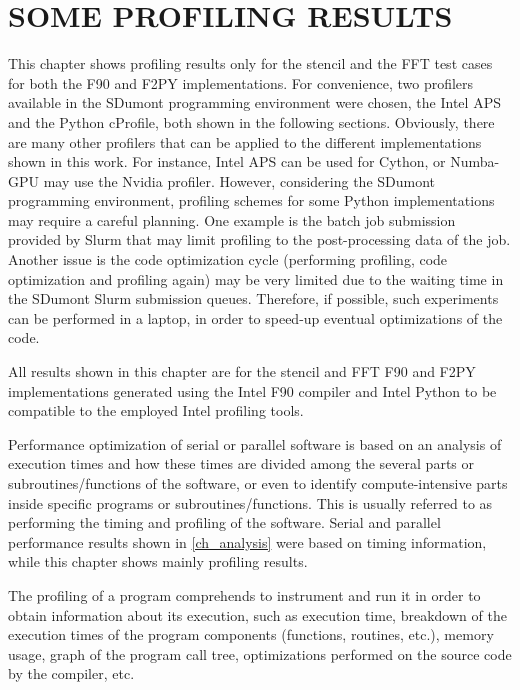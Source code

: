 \chapter{SOME PROFILING RESULTS}
\label{ch_profiling}

This chapter shows profiling results only for the stencil and the FFT test cases for both the F90 and F2PY implementations. For convenience, two profilers available in the SDumont programming environment were chosen, the Intel APS and the Python cProfile, both shown in the following sections. Obviously, there are many other profilers that can be applied to the different implementations shown in this work. For instance, Intel APS can be used for Cython, or Numba-GPU may use the Nvidia profiler. However, considering the SDumont programming environment, profiling schemes for some Python implementations may require a careful planning. One example is the batch job submission provided by Slurm that may limit profiling to the post-processing data of the job. Another issue is the code optimization cycle (performing profiling, code optimization and profiling again) may be very limited due to the waiting time in the SDumont Slurm submission queues. Therefore, if possible, such experiments can be performed in a laptop, in order to speed-up eventual optimizations of the code.

All results shown in this chapter are for the stencil and FFT F90 and F2PY implementations generated using the Intel F90 compiler and Intel Python to be compatible to the employed Intel profiling tools.   

Performance optimization of serial or parallel software is based on an analysis of execution times and how these times are divided among the several parts or subroutines/functions of the software, or even to identify compute-intensive parts inside specific programs or subroutines/functions. This is usually referred to as performing the timing and profiling of the software. Serial and parallel performance results shown in \autoref {ch_analysis} were based on timing information, while this chapter shows mainly profiling results.

The profiling of a program comprehends to instrument and run it in order to obtain information about its execution, such as execution time, breakdown of the execution times of the program components (functions, routines, etc.), memory usage, graph of the program call tree, optimizations performed on the source code by the compiler, etc.

